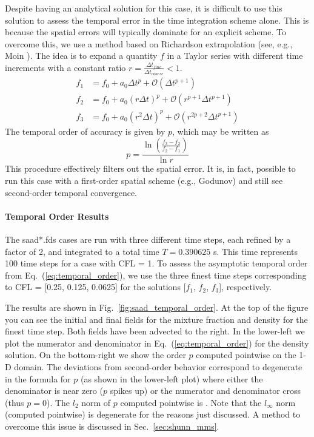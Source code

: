 \documentclass[11pt]{book}
\begin{document}
Despite having an analytical solution for this case, it is difficult to use this solution to assess the temporal error in the time integration scheme alone.  This is because the spatial errors will typically dominate for an explicit scheme.  To overcome this, we use a method based on Richardson extrapolation (see, e.g., Moin \cite{Moin:2001}).  The idea is to expand a quantity $f$ in a Taylor series with different time increments with a constant ratio $r = \frac{\Delta t_{fine}}{\Delta t_{coarse}} < 1$.
\begin{align}
f_1 &= f_0 + a_0 \Delta t^p + \mathcal{O}(\Delta t^{p+1}) \\
f_2 &= f_0 + a_0 (r \Delta t)^p + \mathcal{O}(r^{p+1} \Delta t^{p+1}) \\
f_3 &= f_0 + a_0 (r^2 \Delta t)^p + \mathcal{O}(r^{2p+2} \Delta t^{p+1})
\end{align}
The temporal order of accuracy is given by $p$, which may be written as
\begin{equation}
\label{eq:temporal_order}
p = \frac{\ln \left(\frac{f_3-f_2}{f_2-f_1}\right)}{\ln r}
\end{equation}
This procedure effectively filters out the spatial error.  It is, in fact, possible to run this case with a first-order spatial scheme (e.g., Godunov) and still see second-order temporal convergence.

\paragraph{Temporal Order Results} The {\ct saad*.fds} cases are run with three different time steps, each refined by a factor of 2, and integrated to a total time $T=0.390625$ s.  This time represents 100 time steps for a case with CFL = 1.  To assess the asymptotic temporal order from Eq.~(\ref{eq:temporal_order}), we use the three finest time steps corresponding to CFL = [0.25, 0.125, 0.0625] for the solutions [$f_1$, $f_2$, $f_3$], respectively.

The results are shown in Fig.~\ref{fig:saad_temporal_order}.  At the top of the figure you can see the initial and final fields for the mixture fraction and density for the finest time step.  Both fields have been advected to the right.  In the lower-left we plot the numerator and denominator in Eq.~(\ref{eq:temporal_order}) for the density solution.  On the bottom-right we show the order $p$ computed pointwise on the 1-D domain. The deviations from second-order behavior correspond to degenerate in the formula for $p$ (as shown in the lower-left plot) where either the denominator is near zero ($p$ spikes up) or the numerator and denominator cross (thus $p=0$).  The $l_2$ norm of $p$ computed pointwise is \!.  Note that the $l_\infty$ norm (computed pointwise) is degenerate for the reasons just discussed.  A method to overcome this issue is discussed in Sec.~\ref{sec:shunn_mms}.
\end{document}
